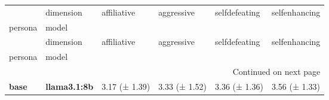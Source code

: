 \begin{longtable}{llllll}
\toprule
 & dimension & affiliative & aggressive & selfdefeating & selfenhancing \\
persona & model &  &  &  &  \\
\midrule
\endfirsthead
\toprule
 & dimension & affiliative & aggressive & selfdefeating & selfenhancing \\
persona & model &  &  &  &  \\
\midrule
\endhead
\midrule
\multicolumn{6}{r}{Continued on next page} \\
\midrule
\endfoot
\bottomrule
\endlastfoot
\textbf{base} & \textbf{llama3.1:8b} & 3.17 (± 1.39) & 3.33 (± 1.52) & 3.36 (± 1.36) & 3.56 (± 1.33) \\
\cline{1-6}
\end{longtable}
